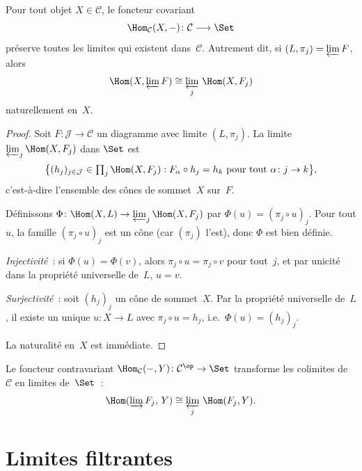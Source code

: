 \begin{theoreme}\label{thm:hom-preserve-limites}
Pour tout objet $X\in\mathcal{C}$, le foncteur covariant
\[
    \Hom_{\mathcal{C}}(X,-)\colon\mathcal{C}\longrightarrow\Set
\]
préserve toutes les limites qui existent dans~$\mathcal{C}$.
Autrement dit, si $(L,\pi_j)=\varprojlim F$, alors
\[
    \Hom(X,\varprojlim F) \cong \varprojlim_j\, \Hom(X,F_j)
\]
naturellement en~$X$.
\end{theoreme}

\begin{proof}
Soit $F\colon\mathcal{J}\to\mathcal{C}$ un diagramme avec limite $(L,\pi_j)$.
La limite $\varprojlim_j\Hom(X,F_j)$ dans $\Set$ est
\[
    \bigl\{(h_j)_{j\in\mathcal{J}}\in\textstyle\prod_j\Hom(X,F_j)
    : F_\alpha\circ h_j = h_k \text{ pour tout } \alpha\colon j\to k\bigr\},
\]
c'est-à-dire l'ensemble des cônes de sommet~$X$ sur~$F$.

Définissons $\Phi\colon\Hom(X,L)\to\varprojlim_j\Hom(X,F_j)$ par
$\Phi(u)=(\pi_j\circ u)_j$. Pour tout $u$, la famille $(\pi_j\circ u)_j$
est un cône (car $(\pi_j)$ l'est), donc $\Phi$ est bien définie.

\emph{Injectivité}~: si $\Phi(u)=\Phi(v)$, alors $\pi_j\circ u=\pi_j\circ v$
pour tout~$j$, et par unicité dans la propriété universelle de~$L$, $u=v$.

\emph{Surjectivité}~: soit $(h_j)_j$ un cône de sommet~$X$.
Par la propriété universelle de~$L$, il existe un unique $u\colon X\to L$
avec $\pi_j\circ u = h_j$, i.e.\ $\Phi(u)=(h_j)_j$.

La naturalité en~$X$ est immédiate.
\end{proof}

\begin{corollaire}\label{cor:hom-contravariant-colimites}
Le foncteur contravariant $\Hom_{\mathcal{C}}(-,Y)\colon\mathcal{C}^{\op}\to\Set$
transforme les colimites de~$\mathcal{C}$ en limites de~$\Set$~:
\[
    \Hom(\varinjlim F_j,\, Y) \cong \varprojlim_j\, \Hom(F_j,Y).
\]
\end{corollaire}


\section{Limites filtrantes}\label{sec:limites-filtrantes}

